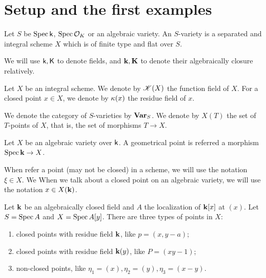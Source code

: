 \section{Setup and the first examples}

    Let $S$ be $\operatorname{Spec} \mathsf{k}$, $\operatorname{Spec} \mathcal{O}_K$ or an algebraic variety.
    An $S$-variety is a separated and integral scheme $X$ which is of finite type and flat over $S$.

    We will use $\mathsf{k},\mathsf{K}$ to denote fields, and $\mathbf{k},\mathbf{K}$ to denote their algebraically closure relatively.

    Let $X$ be an integral scheme.
    We denote by $\mathscr{K}(X)$ the function field of $X$.
    For a closed point $x \in X$, we denote by $\kappa(x)$ the residue field of $x$.

    We denote the category of $S$-varieties by $\mathbf{Var}_S$.
    We denote by $X(T)$ the set of $T$-points of $X$, that is, the set of morphisms $T \to X$.

    Let $X$ be an algebraic variety over $\mathsf{k}$.
    A geometrical point is referred a morphism $\operatorname{Spec} \mathbf{k} \to X$.

    When refer a point (may not be closed) in a scheme, we will use the notation $\xi \in X$.
    We 
    When we talk about a closed point on an algebraic variety, we will use the notation $x \in X(\mathbf{k})$.


\begin{example}
    Let $\mathbf{k}$ be an algebraically closed field and $A$ the localization of $\mathbf{k}[x]$ at $(x)$.
    Let $S = \operatorname{Spec} A$ and $X = \operatorname{Spec} A[y]$. 
    There are three types of points in $X$:
    \begin{enumerate}[label=(\roman*)]
        \item closed points with residue field $\mathbf{k}$, like $p = (x,y-a)$;
        \item closed points with residue field $\mathbf{k}(y)$, like $P = (xy-1)$;
        \item non-closed points, like $\eta_1 = (x),\eta_2 = (y),\eta_3 = (x-y)$.
    \end{enumerate}

\end{example}
